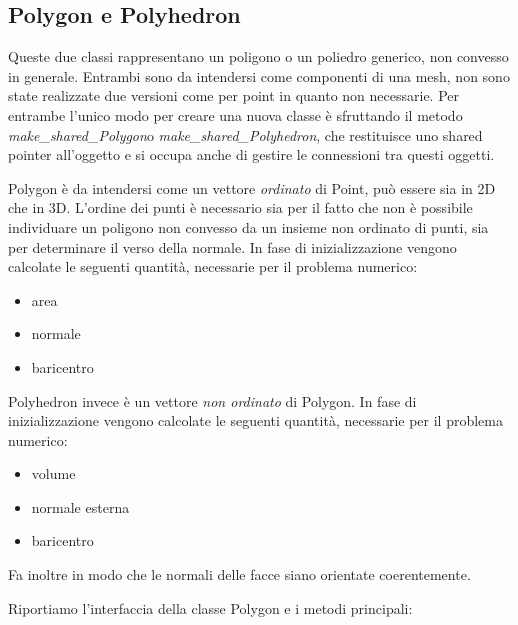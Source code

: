\documentclass[oneside,12pt]{book}  %
\theoremstyle{plain}
\theoremstyle{definition}
\theoremstyle{remark}
\numberwithin{equation}{chapter} %
\begin{document}
\subsection{Polygon e Polyhedron}
Queste due classi rappresentano un poligono o un poliedro generico,
non convesso in generale. Entrambi sono da intendersi come componenti
di una mesh, non sono state realizzate due versioni come per point in
quanto non necessarie. Per entrambe l'unico modo per creare una nuova
classe \`e sfruttando il metodo \textit{make\_shared\_Polygon}o
\textit{make\_shared\_Polyhedron}, che restituisce uno shared pointer
all'oggetto e si occupa anche di gestire le connessioni tra questi
oggetti.

Polygon \`e da intendersi come un vettore \textit{ordinato} di Point,
pu\`o essere sia in 2D che in 3D. L'ordine dei punti \`e necessario
sia per il fatto che non \`e possibile individuare un poligono non
convesso da un insieme non ordinato di punti, sia per determinare il
verso della normale. In fase di inizializzazione vengono calcolate le
seguenti quantit\`a, necessarie per il problema numerico:
\begin{itemize}
\item area
\item normale
\item baricentro
\end{itemize}

 Polyhedron invece \`e un vettore \textit{non ordinato} di Polygon. 
In fase di inizializzazione vengono calcolate le seguenti quantit\`a, 
necessarie per il problema numerico:
\begin{itemize}
\item volume 
\item normale esterna
\item baricentro
\end{itemize}
Fa inoltre in modo che le normali delle facce siano orientate
coerentemente.

Riportiamo l'interfaccia della classe Polygon e i metodi principali:
\end{document}
